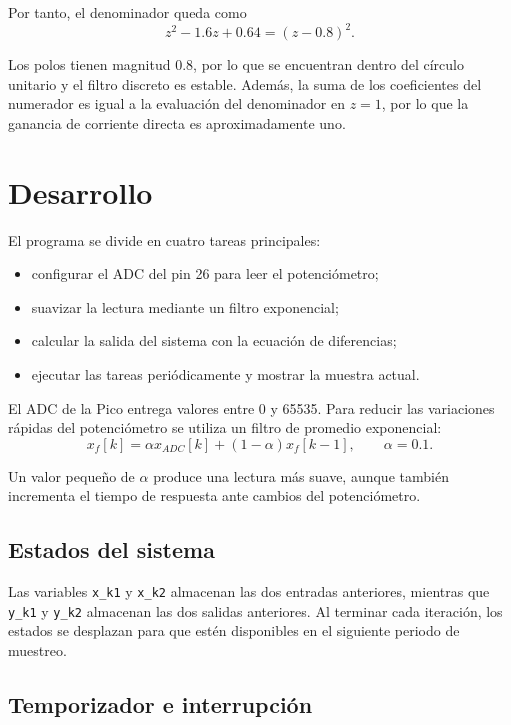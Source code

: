 \documentclass[12pt, letterpaper]{article}
\begin{document}
Por tanto, el denominador queda como
\begin{equation}
    z^2-1.6z+0.64=(z-0.8)^2.
\end{equation}

Los polos tienen magnitud $0.8$, por lo que se encuentran dentro del círculo
unitario y el filtro discreto es estable. Además, la suma de los coeficientes
del numerador es igual a la evaluación del denominador en $z=1$, por lo que la
ganancia de corriente directa es aproximadamente uno.

\section{Desarrollo}

El programa se divide en cuatro tareas principales:
\begin{itemize}
    \item configurar el ADC del pin 26 para leer el potenciómetro;
    \item suavizar la lectura mediante un filtro exponencial;
    \item calcular la salida del sistema con la ecuación de diferencias;
    \item ejecutar las tareas periódicamente y mostrar la muestra actual.
\end{itemize}

El ADC de la Pico entrega valores entre 0 y 65535. Para reducir las variaciones
rápidas del potenciómetro se utiliza un filtro de promedio exponencial:
\begin{equation}
    x_f[k]=\alpha x_{ADC}[k]+(1-\alpha)x_f[k-1],
    \qquad \alpha=0.1.
\end{equation}

Un valor pequeño de $\alpha$ produce una lectura más suave, aunque también
incrementa el tiempo de respuesta ante cambios del potenciómetro.

\subsection{Estados del sistema}

Las variables \texttt{x\_k1} y \texttt{x\_k2} almacenan las dos entradas
anteriores, mientras que \texttt{y\_k1} y \texttt{y\_k2} almacenan las dos
salidas anteriores. Al terminar cada iteración, los estados se desplazan para
que estén disponibles en el siguiente periodo de muestreo.

\subsection{Temporizador e interrupción}
\end{document}
